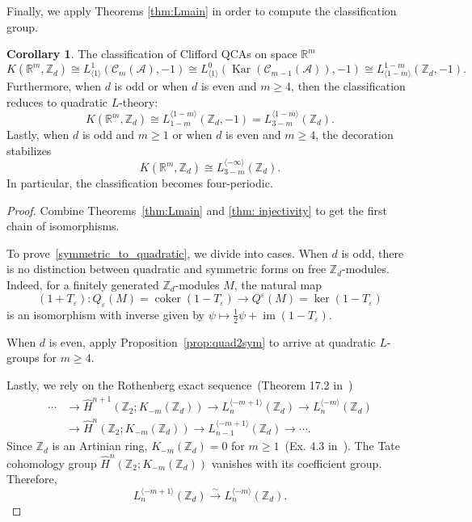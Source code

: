 \documentclass{article}
\theoremstyle{definition}
\newtheorem{cor}[theorem]{Corollary}
\newcommand{\im}{\mathop{\mathrm{im}}}
\newcommand{\coker}{\mathop{\mathrm{coker}}}
\newcommand{\CA}{{ \mathcal A}}
\newcommand{\ZZ}{{\mathbb Z}}
\newcommand{\RR}{{\mathbb R}}
\begin{document}
Finally, we apply Theorems \ref{thm:Lmain} in order to compute the classification group. 
\begin{cor}\label{cor:Euclid}
    The classification of Clifford QCAs on space $\RR^m$
    \begin{equation*}
        K(\RR^m, \ZZ_d)\cong L^1_{\langle 1 \rangle}(\mathcal C_m(\CA),-1)\cong L^0_{\langle 1 \rangle}(\operatorname{Kar}(\mathcal C_{m-1}(\CA)), -1)\cong L^{1-m}_{\langle 1-m \rangle}(\ZZ_d, -1).
    \end{equation*}
    Furthermore, when $d$ is odd or when $d$ is even and $m\geq 4$, then the classification reduces to quadratic $L$-theory: 
    \begin{equation} \label{symmetric_to_quadratic}
        K(\RR^m, \ZZ_d)\cong L_{1-m}^{\langle 1-m \rangle}(\ZZ_d, -1)=L_{3-m}^{\langle 1-m \rangle}(\ZZ_d).
    \end{equation}
    Lastly, when $d$ is odd and $m\geq 1$ or when $d$ is even and $m\geq 4$, the decoration stabilizes
    $$K(\RR^m, \ZZ_d)\cong L_{3-m}^{\langle -\infty \rangle}(\ZZ_d).$$
    In particular, the classification becomes four-periodic. 
\end{cor}
\begin{proof}
    Combine Theorems~\ref{thm:Lmain} and \ref{thm: injectivity} to get the first chain of isomorphisms. 
    
    To prove~\eqref{symmetric_to_quadratic}, we divide into cases. When $d$ is odd, there is no distinction between quadratic and symmetric forms on free $\ZZ_d$-modules. Indeed, for a finitely generated $\ZZ_d$-modules $M$, the natural map 
    $$(1+T_\varepsilon): Q_\varepsilon(M)=\coker(1-T_\varepsilon)\rightarrow Q^\varepsilon(M)=\ker(1-T_\varepsilon)$$ is an isomorphism with inverse given by $\psi \mapsto \frac{1}{2}\psi+\im(1-T_\varepsilon).$
    
    When $d$ is even, apply Proposition~\ref{prop:quad2sym} to arrive at quadratic $L$-groups for $m\geq 4$.

    Lastly, we rely on the Rothenberg exact sequence~(Theorem 17.2 in~\cite{ranicki1992lower})
    \begin{align*}
        \cdots &\rightarrow \hat{H}^{n+1}(\ZZ_2; K_{-m}(\ZZ_d))\rightarrow L_n^{\langle -m+1\rangle}(\ZZ_d)\rightarrow L_n^{\langle -m\rangle}(\ZZ_d)\\ &\rightarrow \hat{H}^{n}(\ZZ_2; K_{-m}(\ZZ_d))\rightarrow L_{n-1}^{\langle -m+1\rangle}(\ZZ_d)\rightarrow \cdots.
    \end{align*}
Since $\ZZ_d$ is an Artinian ring, $K_{-m}(\ZZ_d)=0$ for $m\geq 1$~(Ex. 4.3 in~\cite{weibel2013k}). The Tate cohomology group $\hat{H}^{n}(\ZZ_2; K_{-m}(\ZZ_d))$ vanishes with its coefficient group. Therefore, 
$$L_n^{\langle -m+1\rangle}(\ZZ_d)\xrightarrow{\sim} L_n^{\langle -m\rangle}(\ZZ_d).$$
\end{proof}
\end{document}
